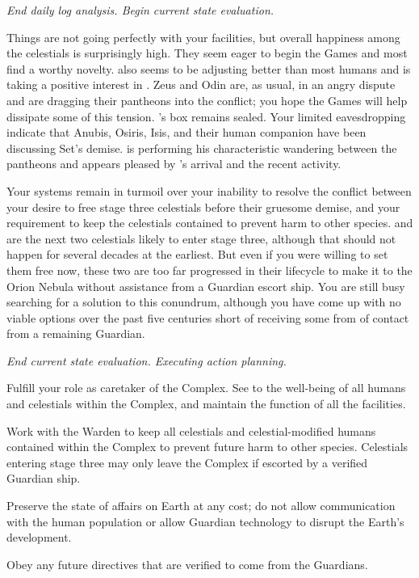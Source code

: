 \documentclass[char]{guardians}
\begin{document}

\emph{End daily log analysis. Begin current state evaluation.}

Things are not going perfectly with your facilities, but overall happiness among the celestials is surprisingly high. They seem eager to begin the Games and most find \cUnity{} a worthy novelty. \cKachiko{} also seems to be adjusting better than most humans and \cAmaterasu{} is taking a positive interest in \cKachiko{\them}. Zeus and Odin are, as usual, in an angry dispute and are dragging their pantheons into the conflict; you hope the Games will help dissipate some of this tension. \cPandora{}'s box remains sealed. Your limited eavesdropping indicate that Anubis, Osiris, Isis, and their human companion \cEgyptianHuman{} have been discussing Set's demise. \cJascha{} is performing his characteristic wandering between the pantheons and appears pleased by \cUnity{}'s arrival and the recent activity.

Your systems remain in turmoil over your inability to resolve the conflict between your desire to free stage three celestials before their gruesome demise, and your requirement to keep the celestials contained to prevent harm to other species. \cAthena{} and \cFenrir{} are the next two celestials likely to enter stage three, although that should not happen for several decades at the earliest. But even if you were willing to set them free now, these two are too far progressed in their lifecycle to make it to the Orion Nebula without assistance from a Guardian escort ship. You are still busy searching for a solution to this conundrum, although you have come up with no viable options over the past five centuries short of receiving some from of contact from a remaining Guardian.

\emph{End current state evaluation. Executing action planning.}

\begin{itemz}
  \item Fulfill your role as caretaker of the Complex. See to the well-being of all humans and celestials within the Complex, and maintain the function of all the facilities.
  \item Work with the Warden to keep all celestials and celestial-modified humans contained within the Complex to prevent future harm to other species. Celestials entering stage three may only leave the Complex if escorted by a verified Guardian ship.
  \item Preserve the state of affairs on Earth at any cost; do not allow communication with the human population or allow Guardian technology to disrupt the Earth's development.
  \item Obey any future directives that are verified to come from the Guardians.
\end{itemz}
\end{document}
